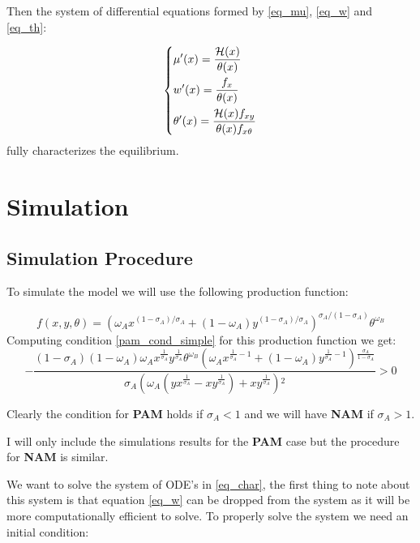 \documentclass[12pt]{article}
\theoremstyle{definition}
\begin{document}
Then the system of differential equations formed by \eqref{eq_mu}, \eqref{eq_w} and \eqref{eq_th}:

\begin{equation}\label{eq_char}
\begin{dcases}
        \mu'(x) = \frac{\mathcal{H}(x)}{\theta(x)} \\
        w^{\prime}(x) =\frac{f_{x}}{\theta(x)}   \\
        \theta'(x) = \frac{\mathcal{H}(x)f_{x y}}{\theta(x) f_{x \theta}}
\end{dcases}
\end{equation}
fully characterizes the equilibrium.


\section{Simulation}

\subsection{Simulation Procedure}
To simulate the model we will use the following production function:

\begin{equation}\label{prod_funct}
    f(x,y,\theta) = \left(\omega_{A} x^{\left(1-\sigma_{A}\right) / \sigma_{A}}+\left(1-\omega_{A}\right) y^{\left(1-\sigma_{A}\right) / \sigma_{A}}\right)^{\sigma_{A} /\left(1-\sigma_{A}\right)} \theta^{\omega_{B}}
\end{equation}
Computing condition \ref{pam_cond_simple} for this production function we get:
\begin{equation}
    -\frac{\left(1-\sigma _A\right) \left(1-\omega _A\right) \omega
    _A x^{\frac{1}{\sigma _A}} y^{\frac{1}{\sigma _A}} \theta
   ^{\omega _B} \left(\omega _A x^{\frac{1}{\sigma
   _A}-1}+\left(1-\omega_A\right) y^{\frac{1}{\sigma
   _A}-1}\right){}^{\frac{\sigma _A}{1-\sigma _A}}}{\sigma _A
   \left(\omega _A \left(y x^{\frac{1}{\sigma _A}}-x
   y^{\frac{1}{\sigma _A}}\right)+x y^{\frac{1}{\sigma
   _A}}\right){}^2} > 0
\end{equation}

Clearly the condition for \textbf{PAM} holds if $\sigma_A < 1$ and we will have \textbf{NAM} if $\sigma_A > 1$.

I will only include the simulations results for the \textbf{PAM} case but the procedure for \textbf{NAM} is similar.

We want to solve the system of ODE's in \ref{eq_char}, the first thing to note about this system is that equation \ref{eq_w} can be dropped from the system as it will be more computationally efficient to solve.
To properly solve the system we need an initial condition:
\end{document}
